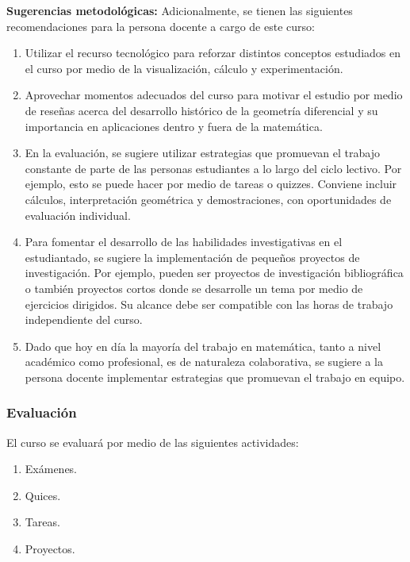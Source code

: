 \begin{refsection}
\textbf{Sugerencias metodológicas:} Adicionalmente, se tienen las siguientes recomendaciones para la persona docente a cargo de este curso:
\begin{enumerate}
    \item Utilizar el recurso tecnológico para reforzar distintos conceptos estudiados en el curso por medio de la visualización, cálculo y experimentación.
    \item Aprovechar momentos adecuados del curso para motivar el estudio por medio de reseñas acerca del desarrollo histórico de la geometría diferencial y su importancia en aplicaciones dentro y fuera de la matemática.
    \item En la evaluación, se sugiere utilizar estrategias que promuevan el trabajo constante de parte de las personas estudiantes a lo largo del ciclo lectivo. Por ejemplo, esto se puede hacer por medio de tareas o quizzes. Conviene incluir cálculos, interpretación geométrica y demostraciones, con oportunidades de evaluación individual.
    \item Para fomentar el desarrollo de las habilidades investigativas en el estudiantado, se sugiere la implementación de pequeños proyectos de investigación. Por ejemplo, pueden ser proyectos de investigación bibliográfica o también proyectos cortos donde se desarrolle un tema por medio de ejercicios dirigidos. Su alcance debe ser compatible con las horas de trabajo independiente del curso.
    \item Dado que hoy en día la mayoría del trabajo en matemática, tanto a nivel académico como profesional, es de naturaleza colaborativa, se sugiere a la persona docente implementar estrategias que promuevan el trabajo en equipo.
\end{enumerate}



\subsubsection*{Evaluación}

El curso se evaluará por medio de las siguientes actividades:

\begin{enumerate}
\item Exámenes.
\item Quices.
\item Tareas.
\item Proyectos.
\end{enumerate}

\nocite{DoC16}
\nocite{Kuh15}
\nocite{ONeil06}


\printcursosbibliography
\end{refsection}
